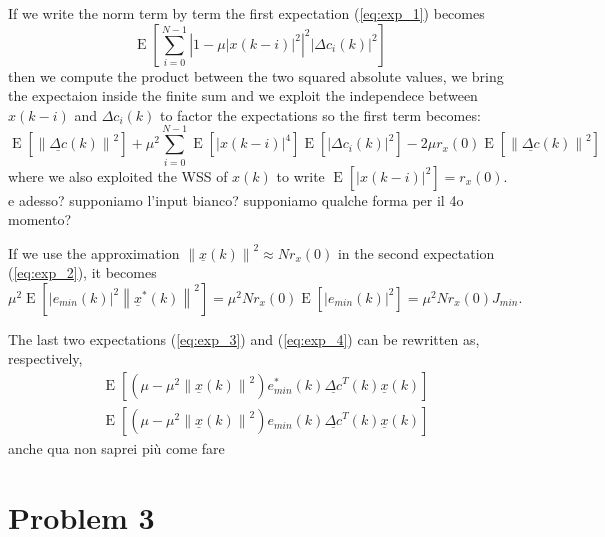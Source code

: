 \documentclass{article}
\renewcommand{\vec}[1]{\underline{#1}}
\newcommand{\E}[1]{\operatorname{E}\left[#1\right]}
\newcommand{\norm}[1]{\left\lVert#1\right\rVert}
\newcommand{\abs}[1]{\left|#1\right|}
\begin{document}
If we write the norm term by term the first expectation
(\ref{eq:exp_1}) becomes
\[ \E{\sum_{i=0}^{N-1}\abs{1 - \mu\abs{x(k-i)}^2}^2\abs{\Delta c_i(k)}^2} \]
then we compute the product between the two squared absolute values,
we bring the expectaion inside the finite sum and we exploit the
independece between $x(k-i)$ and $\Delta c_i(k)$ to factor the
expectations so the first term becomes:
\[ \E{\norm{\vec{\Delta c}(k)}^2} +
\mu^2\sum_{i=0}^{N-1}\E{\abs{x(k-i)}^4}\E{\abs{\Delta c_i(k)}^2} - 2\mu
r_x(0)\E{\norm{\vec{\Delta c}(k)}^2}
\]
where we also exploited the WSS of $x(k)$ to write $\E{\abs{x(k-i)}^2}
= r_x(0)$. {\color{red} e adesso? supponiamo l'input bianco? supponiamo qualche forma per il 4o momento?}

If we use the approximation $\norm{\vec{x}(k)}^2 \approx Nr_x(0)$ in
the second expectation (\ref{eq:exp_2}), it becomes
\[
\mu^2 \E{\abs{e_{min}(k)}^2 \norm{\vec{x}^*(k)}^2}
= \mu^2Nr_x(0)\E{\abs{e_{min}(k)}^2}
= \mu^2Nr_x(0)J_{min} .
\]

The last two expectations (\ref{eq:exp_3}) and (\ref{eq:exp_4}) can be
rewritten as, respectively,
\begin{align*}
  & \E{\left(\mu - \mu^2\norm{\vec{x}(k)}^2\right) e_{min}^*(k) \vec{\Delta c}^T(k)\vec{x}(k)} \\
  & \E{\left(\mu - \mu^2\norm{\vec{x}(k)}^2\right) e_{min}(k) \vec{\Delta c}^T(k)\vec{x}(k)}
\end{align*}
{\color{red} anche qua non saprei più come fare}
\section*{Problem 3}
\end{document}
